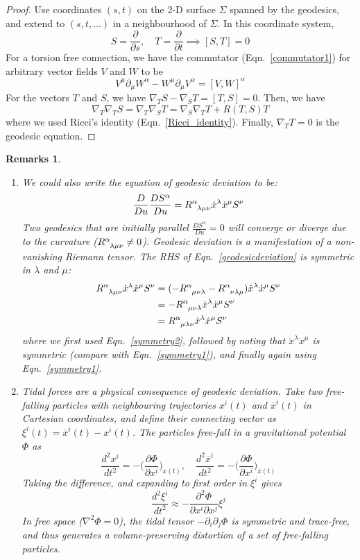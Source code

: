 \documentclass[a4paper]{article}
\newtheorem{remarks}{Remarks}[section]
\theoremstyle{new}
\begin{document}
\begin{proof}
Use coordinates $(s,t)$ on the 2-D surface $\Sigma$ spanned by the geodesics, and extend to $(s,t,\dots )$ in a neighbourhood of $\Sigma$. In this coordinate system,
$$S=\frac{\partial}{\partial s},\quad T=\frac{\partial}{\partial t}\implies[S,T]=0$$
For a torsion free connection, we have the commutator (Eqn.~\ref{commutator1}) for arbitrary vector fields $V$ and $W$ to be
$$V^\mu\partial_\mu W^\alpha-W^\mu\partial_\mu V^\alpha=[V,W]^\alpha$$
For the vectors $T$ and $S$, we have $\nabla_TS-\nabla_ST=[T,S]=0$. Then, we have
$$\nabla_T\nabla_TS=\nabla_T\nabla_ST=\nabla_S\nabla_TT+R(T,S)T$$
where we used Ricci's identity (Eqn.~\ref{Ricci_identity}). Finally, $\nabla_TT=0$ is the geodesic equation.
\end{proof}
\begin{remarks}\leavevmode
\begin{enumerate}
\item We could also write the equation of geodesic deviation to be:
\begin{equation}
    \frac{D}{Du}\frac{DS^\alpha}{Du}=\tensor*{R}{*_{}^{\alpha}_{\lambda\mu\nu}}\dot{x}^\lambda\dot{x}^\mu S^\nu\label{geodesicdeviation}
\end{equation}
Two geodesics that are initially parallel $\frac{DS^\alpha}{Du}=0$ will converge or diverge due to the curvature ($\tensor*{R}{*_{}^{\alpha}_{\lambda\mu\nu}}\neq 0$). Geodesic deviation is a manifestation of a non-vanishing Riemann tensor. The RHS of Eqn.~\ref{geodesicdeviation} is symmetric in $\lambda$ and $\mu$:
\begin{align}
\tensor*{R}{*_{}^{\alpha}_{\lambda\mu\nu}}\dot{x}^\lambda\dot{x}^\mu S^\nu&=(-\tensor*{R}{*_{}^{\alpha}_{\mu\nu\lambda}}-\tensor*{R}{*_{}^{\alpha}_{\nu\lambda\mu}})\dot{x}^\lambda\dot{x}^\mu S^\nu\nonumber\\&=-\tensor*{R}{*_{}^{\alpha}_{\mu\nu\lambda}}\dot{x}^\lambda\dot{x}^\mu S^\nu\nonumber\\&=\tensor*{R}{*_{}^{\alpha}_{\mu\lambda\nu}}\dot{x}^\lambda\dot{x}^\mu S^\nu\nonumber
\end{align}
where we first used Eqn.~\ref{symmetry2}, followed by noting that $\dot{x}^\lambda\dot{x}^\mu$ is symmetric (compare with Eqn.~\ref{symmetry1}), and finally again using Eqn.~\ref{symmetry1}.
\item Tidal forces are a physical consequence of geodesic deviation. Take two free-falling particles with neighbouring trajectories $x^i(t)$ and $\overline{x}^i(t)$ in Cartesian coordinates, and define their connecting vector as $\xi^i(t)=\overline{x}^i(t)-x^i(t)$. The particles free-fall in a gravitational potential $\Phi$ as
$$\frac{d^2x^i}{dt^2}=-\bigg(\frac{\partial\Phi}{\partial x^i}\bigg)_{x(t)},\quad\frac{d^2\overline{x}^i}{dt^2}=-\bigg(\frac{\partial\Phi}{\partial x^i}\bigg)_{\overline{x}(t)}$$
Taking the difference, and expanding to first order in $\xi^i$ gives
$$\frac{d^2\xi^i}{dt^2}\approx-\frac{\partial^2\Phi}{\partial x^i\partial x^j}\xi^j$$
In free space ($\nabla^2\Phi=0$), the tidal tensor $-\partial_i\partial_j\Phi$ is symmetric and trace-free, and thus generates a volume-preserving distortion of a set of free-falling particles.
\end{enumerate}
\end{remarks}
\end{document}
